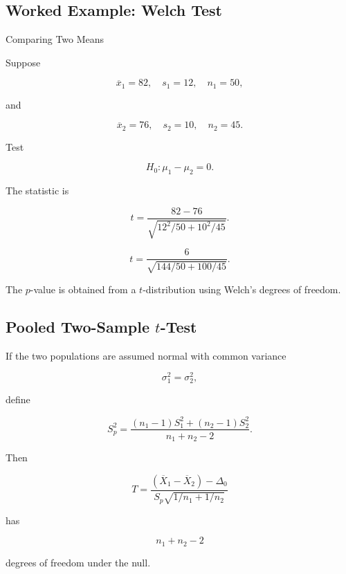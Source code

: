 \subsection{Worked Example: Welch Test}
\label{subsec:worked-welch-test}

\begin{workedexamplebox}{Comparing Two Means}

Suppose

\[
\overline{x}_1=82,
\quad
s_1=12,
\quad
n_1=50,
\]

and

\[
\overline{x}_2=76,
\quad
s_2=10,
\quad
n_2=45.
\]

Test

\[
H_0:\mu_1-\mu_2=0.
\]

The statistic is

\[
t
=
\frac{
82-76
}{
\sqrt{
12^2/50
+
10^2/45
}
}.
\]

\begin{answerbox}
\[
\boxed{
t
=
\frac{
6
}{
\sqrt{
144/50+100/45
}
}.
}
\]
\end{answerbox}

The \(p\)-value is obtained from a \(t\)-distribution using Welch's
degrees of freedom.

\end{workedexamplebox}

\subsection{Pooled Two-Sample \(t\)-Test}
\label{subsec:pooled-two-sample-test}

If the two populations are assumed normal with common variance

\[
\sigma_1^2=\sigma_2^2,
\]

define

\[
\boxed{
S_p^2
=
\frac{
(n_1-1)S_1^2
+
(n_2-1)S_2^2
}{
n_1+n_2-2
}.
}
\]

Then

\[
\boxed{
T
=
\frac{
(\overline{X}_1-\overline{X}_2)-\Delta_0
}{
S_p
\sqrt{
1/n_1+1/n_2
}
}
}
\]

has

\[
\boxed{
n_1+n_2-2
}
\]

degrees of freedom under the null.

